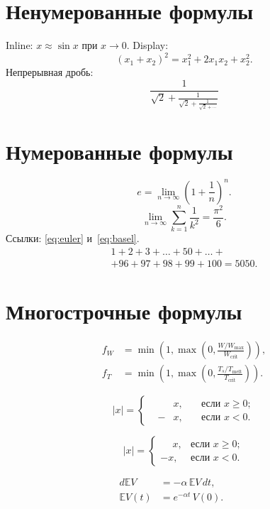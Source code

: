 \documentclass[font=modern]{cmcmsuthesis-doctoral}
\begin{document}
\section{Ненумерованные формулы}
Inline: $x\approx\sin x$ при $x\to 0$.
Display: \[(x_1+x_2)^2=x_1^2+2x_1x_2+x_2^2.\]
Непрерывная дробь:
\[\frac{1}{\sqrt{2}+\displaystyle\frac{1}{\sqrt{2}+\displaystyle\frac{1}{\sqrt{2}+\cdots}}}\]

\section{Нумерованные формулы}
\begin{equation}\label{eq:euler}e=\lim_{n\to\infty}\left(1+\frac{1}{n}\right)^{\!n}.\end{equation}
\begin{equation}\label{eq:basel}\lim_{n\to\infty}\sum_{k=1}^n\frac{1}{k^2}=\frac{\pi^2}{6}.\end{equation}
Ссылки: \eqref{eq:euler} и~\eqref{eq:basel}.
\begin{equation}\label{eq:long}\begin{multlined}1+2+3+\dots+50+\dots+\\+96+97+98+99+100=5050.\end{multlined}\end{equation}

\section{Многострочные формулы}
\[\begin{aligned}f_W&=\min\!\left(1,\max\!\left(0,\frac{W/W_{\max}}{W_{\text{crit}}}\right)\right),\\f_T&=\min\!\left(1,\max\!\left(0,\frac{T_s/T_{\text{melt}}}{T_{\text{crit}}}\right)\right).\end{aligned}\]

\[|x|=\left\{\begin{alignedat}{2}& &x,\quad&\text{если }x\geqslant 0;\\&-&x,\quad&\text{если }x<0.\end{alignedat}\right.\]

\[|x|=\begin{cases}\phantom{-}x,&\text{если }x\geqslant 0;\\-x,&\text{если }x<0.\end{cases}\]

\begin{equation}\label{eq:ito}\begin{alignedat}{2}
d\mathbb{E}V&=-\alpha\,\mathbb{E}V\,dt,&\quad&\\
\mathbb{E}V(t)&=e^{-\alpha t}\,V(0).&&
\end{alignedat}\end{equation}
\end{document}
